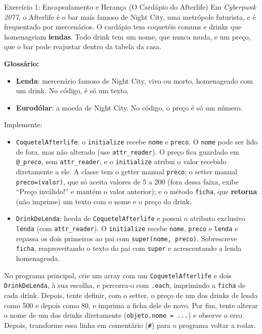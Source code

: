 \begin{exercicio}{Exercício 1: Encapsulamento e Herança (O Cardápio do Afterlife)}
Em \textit{Cyberpunk 2077}, o Afterlife é o bar mais famoso de Night City, uma metrópole
futurista, e é frequentado por mercenários. O cardápio tem coquetéis comuns e drinks que
homenageiam \textbf{lendas}. Todo drink tem um nome, que nunca muda, e um preço, que o bar pode
reajustar dentro da tabela da casa.

\textbf{Glossário:}
\begin{itemize}
    \item \textbf{Lenda}: mercenário famoso de Night City, vivo ou morto, homenageado com um
    drink. No código, é só um texto.
    \item \textbf{Eurodólar}: a moeda de Night City. No código, o preço é só um número.
\end{itemize}

Implemente:

\begin{itemize}
    \item \texttt{CoquetelAfterlife}: o \texttt{initialize} recebe \texttt{nome} e
    \texttt{preco}. O \texttt{nome} pode ser lido de fora, mas não alterado (use
    \texttt{attr\_reader}). O preço fica guardado em \texttt{@\_preco}, sem
    \texttt{attr\_reader}, e o \texttt{initialize} atribui o valor recebido diretamente a ele. A
    classe tem o getter manual \texttt{preco}; o setter manual \texttt{preco=(valor)}, que só
    aceita valores de 5 a 200 (fora dessa faixa, exibe ``Preço inválido!'' e mantém o valor
    anterior); e o método \texttt{ficha}, que \textbf{retorna} (não imprime) um texto com o nome
    e o preço do drink.

    \item \texttt{DrinkDeLenda}: herda de \texttt{CoquetelAfterlife} e possui o atributo
    exclusivo \texttt{lenda} (com \texttt{attr\_reader}). O \texttt{initialize} recebe
    \texttt{nome}, \texttt{preco} e \texttt{lenda} e repassa os dois primeiros ao pai com
    \texttt{super(nome, preco)}. Sobrescreve \texttt{ficha}, reaproveitando o texto do pai com
    \texttt{super} e acrescentando a lenda homenageada.
\end{itemize}

No programa principal, crie um array com um \texttt{CoquetelAfterlife} e dois
\texttt{DrinkDeLenda}, à sua escolha, e percorra-o com \texttt{.each}, imprimindo a
\texttt{ficha} de cada drink. Depois, tente definir, com o setter, o preço de um dos drinks de
lenda como 500 e depois como 80, e imprima a ficha dele de novo. Por fim, tente alterar o nome de um dos drinks
diretamente (\texttt{objeto.nome = ...}) e observe o erro. Depois, transforme essa linha em
comentário (\texttt{\#}) para o programa voltar a rodar.
\end{exercicio}

